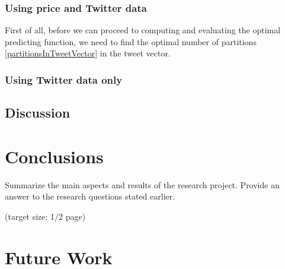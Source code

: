 \documentclass[a4paper,11pt,oneside]{article}
\begin{document}
  \subsubsection{Using price and Twitter data}
  First of all, before we can proceed to computing and evaluating the optimal predicting function, we need to find the optimal number of partitions \eqref{partitionsInTweetVector} in the tweet vector.
  \subsubsection{Using Twitter data only}
  
  
  \subsection{Discussion}

  \section{Conclusions}

  Summarize the main aspects and results of the research
  project. Provide an answer to the research questions stated earlier.

  (target size: 1/2 page)
  
  \section{Future Work}


  \newpage
  
  
\end{document}
